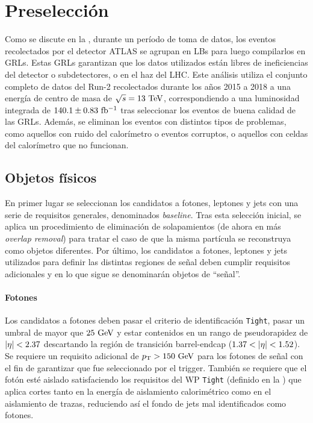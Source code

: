 \section{Preselección}
\label{sec:evt_selection:presel}



Como se discute en la \Sect{\ref{sec:atlas:runs}}, durante un período de toma de datos, los eventos recolectados por el detector \ac{ATLAS} se agrupan en \acp{LB} para luego compilarlos en \acp{GRL}. Estas \acp{GRL} garantizan que los datos utilizados están libres de ineficiencias del detector o subdetectores, o en el haz del \ac{LHC}. Este análisis utiliza el conjunto completo de datos del Run-2 recolectados durante los años 2015 a 2018 a una energía de centro de masa de \(\sqs = 13~\tev\), correspondiendo a una luminosidad integrada de \(140.1 \pm 0.83~\ifb\) tras seleccionar los eventos de buena calidad de las \acp{GRL}. Además, se eliminan los eventos con distintos tipos de problemas, como aquellos con ruido del calorímetro o eventos corruptos, o aquellos con celdas del calorímetro que no funcionan.





\subsection{Objetos físicos}
\label{subsec:evt_selection:presel:objs}

En primer lugar se seleccionan los candidatos a fotones, leptones y jets con una serie de requisitos generales, denominados \textit{baseline}. Tras esta selección inicial, se aplica un procedimiento de eliminación de solapamientos (de ahora en más \textit{overlap removal}) para tratar el caso de que la misma partícula se reconstruya como objetos diferentes. Por último, los candidatos a fotones, leptones y jets utilizados para definir las distintas regiones de señal deben cumplir requisitos adicionales y en lo que sigue se denominarán objetos de \enquote{señal}.


\paragraph{Fotones}

Los candidatos a fotones deben pasar el criterio de identificación \texttt{Tight}, pasar un umbral de  \pt mayor que \(25~\GeV\) y estar contenidos en un rango de pseudorapidez de \(\abseta < 2.37\) descartando la región de transición barrel-endcap (\(1.37 < \abseta < 1.52\)). Se requiere un requisito adicional de \(\pt > 150~\GeV\) para los fotones de señal con el fin de garantizar que fue seleccionado por el trigger. También se requiere que el fotón esté aislado satisfaciendo los requisitos del \ac{WP} \texttt{Tight} (definido en la \Sect{\ref{subsec:objects:egamma:iso}}) que aplica cortes tanto en la energía de aislamiento calorimétrico como en el aislamiento de trazas, reduciendo así el fondo de jets mal identificados como fotones.


